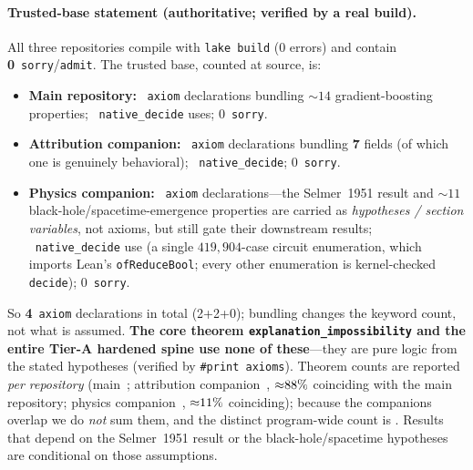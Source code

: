\documentclass[11pt,a4paper]{article}
\begin{document}
\paragraph{Trusted-base statement (authoritative; verified by a real build).}
All three repositories compile with \texttt{lake build} (0 errors) and contain
\textbf{0}~\texttt{sorry}/\texttt{admit}. The trusted base, counted at source, is:
\begin{itemize}\itemsep2pt
  \item \textbf{Main repository:} \textbf{\ClaimMainAxioms}~\texttt{axiom} declarations bundling ${\sim}14$
    gradient-boosting properties; \textbf{\ClaimMainNativeDecide}~\texttt{native\_decide} uses; 0~\texttt{sorry}.
  \item \textbf{Attribution companion:} \textbf{\ClaimDashAxioms}~\texttt{axiom} declarations bundling
    \textbf{7} fields (of which one is genuinely behavioral); \textbf{\ClaimDashNativeDecide}~\texttt{native\_decide};
    0~\texttt{sorry}.
  \item \textbf{Physics companion:} \textbf{\ClaimOstrowskiAxioms}~\texttt{axiom} declarations---the Selmer~1951
    result and ${\sim}11$ black-hole/spacetime-emergence properties are carried as
    \emph{hypotheses / section variables}, not axioms, but still gate their downstream results;
    \textbf{\ClaimOstrowskiNativeDecide}~\texttt{native\_decide} use (a single $419{,}904$-case circuit
    enumeration, which imports Lean's \texttt{ofReduceBool}; every other enumeration is kernel-checked
    \texttt{decide}); 0~\texttt{sorry}.
\end{itemize}
So \textbf{4}~\texttt{axiom} declarations in total (2+2+0); bundling changes the keyword count,
not what is assumed. \textbf{The core theorem \texttt{explanation\_impossibility} and the entire
Tier-A hardened spine use none of these}---they are pure logic from the stated hypotheses (verified
by \texttt{\#print axioms}). Theorem counts are reported \emph{per repository} (main~\ClaimMainTheorems;
attribution companion~\ClaimDashTheorems, ${\approx}88\%$ coinciding with the main repository; physics
companion~\ClaimOstrowskiTheorems, ${\approx}11\%$ coinciding); because the companions overlap we do \emph{not} sum
them, and the distinct program-wide count is \ClaimDistinctTheorems. Results that depend on the
Selmer~1951 result or the black-hole/spacetime hypotheses are conditional on those assumptions.
\end{document}
